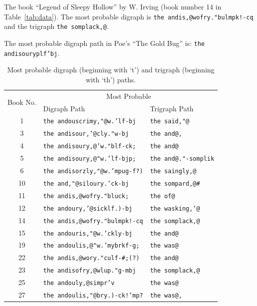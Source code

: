 \documentclass[conference]{IEEEtran}
\newcommand{\codeinline}[1]{{\fontsize{8}{0}\selectfont\texttt{#1}}}
\newcommand{\codeintable}[1]{{\fontsize{6.215}{7.458}\selectfont\texttt{#1}}}
\newcommand{\codefile}[1]{
  \begin{framed}
  \fontsize{5.65}{6.78}\selectfont
  
  \end{framed}
}
\begin{document}
\codefile{problem1f.py}

The book ``Legend of Sleepy Hollow'' by W. Irving (book number 14 in Table~\ref{tab:data}).
The most probable digraph is \codeinline{the andis,@wofry."bulmpk!-cq} and the 
trigraph \codeinline{the somplack,@}.

The most probable digraph path in Poe's ``The Gold Bug'' is: \codeinline{the andisouryplf'bj}.

\begin{table}
\caption{\hspace{2em}Most probable digraph (beginning with `t') and \newline 
trigraph (beginning with `th') paths.\label{tab:problem1f}}
\vspace{-10pt}
\begin{center}
\begin{tabular}{cll}
\hline 
\multirow{2}{*}{Book No.} & \multicolumn{2}{c}{Most Probable}  \\
\cline{2-3}
 & Digraph Path & Trigraph Path \\
\hline
1  & \codeintable{the andouscrimy,"@w.'lf-bj} & \codeintable{the said,"@} \\
3  & \codeintable{the andisour,'@cly."w-bj} & \codeintable{the and@,} \\
4  & \codeintable{the andisoury,@'w."blf-ck;} & \codeintable{the and@} \\
5  & \codeintable{the andisoury,@"w.'lf-bjp;} & \codeintable{the and@."-somplik} \\
6  & \codeintable{the andisorzly,"@w.'mpug-f?)} & \codeintable{the saingly,@} \\
10 & \codeintable{the and,"@siloury.'ck-bj} & \codeintable{the sompard,@\#} \\
11 & \codeintable{the andis,@wofry."bluck;} & \codeintable{the of@} \\
12 & \codeintable{the andoury,'@sicklf.)-bj} & \codeintable{the wasking,'@} \\
14 & \codeintable{the andis,@wofry."bulmpk!-cq} & \codeintable{the somplack,@} \\
15 & \codeintable{the andouris,"@w.'ckly-bj} & \codeintable{the and@} \\
19 & \codeintable{the andoulis,@"w.'mybrkf-g;} & \codeintable{the was@} \\
22 & \codeintable{the andis,@wory."culf-\#;(?)} & \codeintable{the and@} \\
23 & \codeintable{the andisofry,@wlup."g-mbj} & \codeintable{the somplack,@} \\
25 & \codeintable{the andouly,@simpr'v} & \codeintable{the was@} \\
27 & \codeintable{the andoulis,"@bry.)-ck!'mp?} & \codeintable{the was@,} \\
\hline
\end{tabular}
\end{center}
\end{table}
\end{document}
